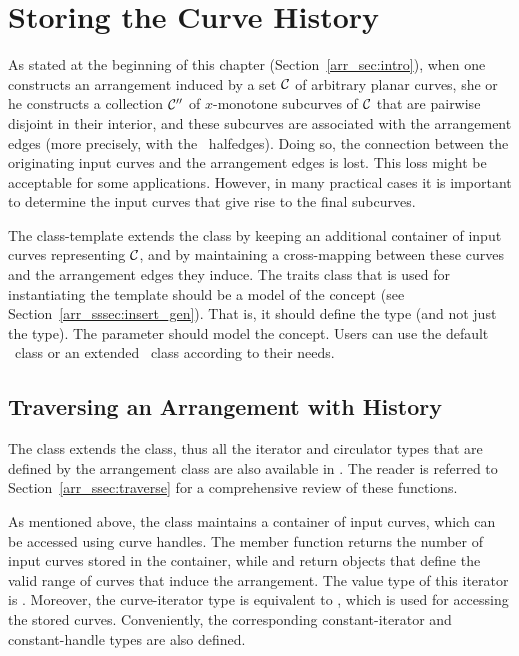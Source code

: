 \section{Storing the Curve History\label{arr_sec:arr_with_hist}}

As stated at the beginning of this chapter (Section~\ref{arr_sec:intro}), 
when one constructs an arrangement induced by a set ${\cal C}$ of arbitrary 
planar curves, she or he constructs a collection ${\cal C}''$ of $x$-monotone 
subcurves of ${\cal C}$ that are pairwise disjoint in their interior, and these 
subcurves are associated with the arrangement edges (more precisely, with the 
\dcel\ halfedges). Doing so, the connection between the originating input 
curves and the arrangement edges is lost. This loss might be acceptable for 
some applications. However, in many practical cases it is important to 
determine the input curves that give rise to the final subcurves.

The  class-template extends
the  class by keeping an additional container of input
curves representing ${\cal C}$, and by maintaining a cross-mapping between these
curves and the arrangement edges they induce. The traits class that is
used for instantiating the template should be a model of the
 concept (see Section~\ref{arr_sssec:insert_gen}).
That is, it should define the  type (and not just the
 type). The  parameter should model the 
 concept. Users can use the default \dcel\ class or 
an extended \dcel\ class according to their needs.

\subsection{Traversing an Arrangement with History\label{arr_ssec:arrwh_traverse}}

The  class extends the 
class, thus all the iterator and circulator types that are defined by the
arrangement class are also available in .
The reader is referred to Section~\ref{arr_ssec:traverse} for a comprehensive
review of these functions.

As mentioned above, the  class maintains
a container of input curves, which can be accessed using curve handles.
The member function  returns the number of input 
curves stored in the container, while  and 
 return 
objects that define the  valid range of curves that induce the arrangement.
The value type of this iterator is . Moreover, the curve-iterator
type is equivalent to  , which
is used for accessing the stored curves. Conveniently, the corresponding
constant-iterator and constant-handle types are also defined.

